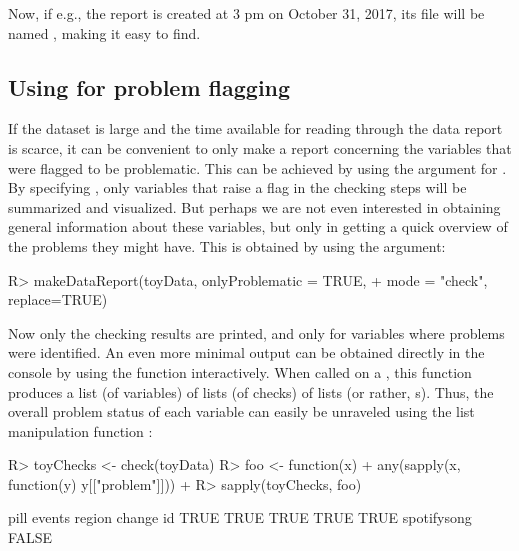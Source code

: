 \documentclass[article,shortnames]{jss}
\begin{document}
Now, if e.g., the report is created at 3 pm on October 31, 2017, its file will be named , making it easy to find. 


\subsection[Using dataMaid for problem flagging]{Using  for problem flagging}
If the dataset is large and the time available for reading through the data report is scarce, it can be convenient to only make a report concerning the variables that were flagged to be problematic. This can be achieved by using the  argument for
. By specifying , only
variables that raise a flag in the checking steps will be summarized
and visualized. But perhaps we are not even interested in obtaining
general information about these variables, but only in getting a quick
overview of the problems they might have. This is obtained by
using the  argument:


\begin{Schunk}
\begin{Sinput}
R> makeDataReport(toyData, onlyProblematic = TRUE, 
+    mode = "check", replace=TRUE)
\end{Sinput}
\end{Schunk}

Now only the checking results are printed, and only for variables
where problems were identified. An even more minimal output  can be obtained directly in the console by using the  function interactively. When called on a , this function produces a list (of
variables) of lists (of checks) of lists (or rather,
s). Thus, the overall problem status of each variable
can easily be unraveled using the list manipulation function
:

\begin{Schunk}
\begin{Sinput}
R> toyChecks <- check(toyData)
R> foo <- function(x) {
+    any(sapply(x, function(y) y[["problem"]]))
+  }
R> sapply(toyChecks, foo)
\end{Sinput}
\begin{Soutput}
       pill      events      region      change          id 
       TRUE        TRUE        TRUE        TRUE        TRUE 
spotifysong 
      FALSE 
\end{Soutput}
\end{Schunk}
\end{document}
